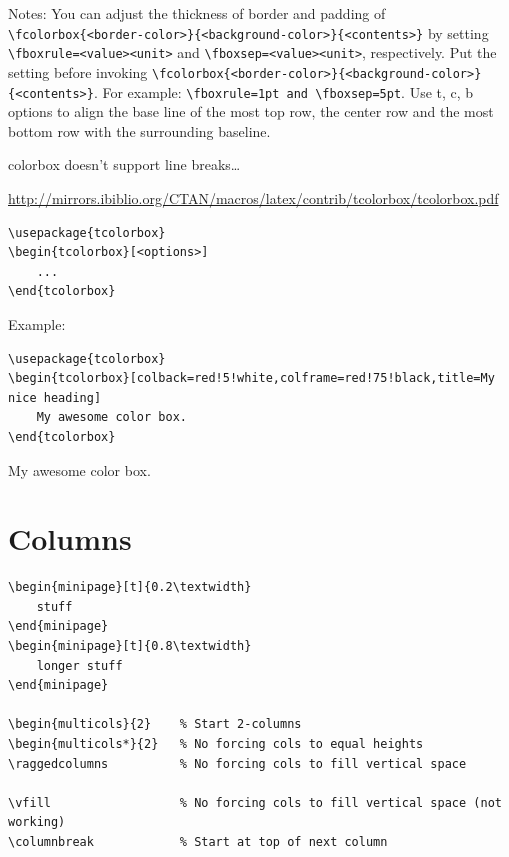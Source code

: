 \documentclass{article}
\begin{document}
Notes:
You can adjust the thickness of border and padding of
\verb|\fcolorbox{<border-color>}{<background-color>}{<contents>}|
by setting \verb|\fboxrule=<value><unit>| and
\verb|\fboxsep=<value><unit>|, respectively. Put the setting
before invoking
\verb|\fcolorbox{<border-color>}{<background-color>}{<contents>}|.
For example: \verb|\fboxrule=1pt and \fboxsep=5pt|. Use
\textrm{t}, \textrm{c}, \textrm{b}
options to align the base line of the most top row,
the center row and the most bottom row with the surrounding baseline.

colorbox doesn't support line breaks\ldots

\url{http://mirrors.ibiblio.org/CTAN/macros/latex/contrib/tcolorbox/tcolorbox.pdf}
\begin{lstlisting}
\usepackage{tcolorbox}
\begin{tcolorbox}[<options>]
    ...
\end{tcolorbox}
\end{lstlisting}

Example:
\begin{lstlisting}
\usepackage{tcolorbox}
\begin{tcolorbox}[colback=red!5!white,colframe=red!75!black,title=My nice heading]
    My awesome color box.
\end{tcolorbox}
\end{lstlisting}
\begin{tcolorbox}[colback=red!5!white,colframe=red!75!black,title=My nice heading]
    My awesome color box.
\end{tcolorbox}


\section{Columns}
\begin{verbatim}
\begin{minipage}[t]{0.2\textwidth}
    stuff
\end{minipage}
\begin{minipage}[t]{0.8\textwidth}
    longer stuff
\end{minipage}

\begin{multicols}{2}    % Start 2-columns
\begin{multicols*}{2}   % No forcing cols to equal heights
\raggedcolumns          % No forcing cols to fill vertical space

\vfill                  % No forcing cols to fill vertical space (not working)
\columnbreak            % Start at top of next column
\end{verbatim}
\end{document}
